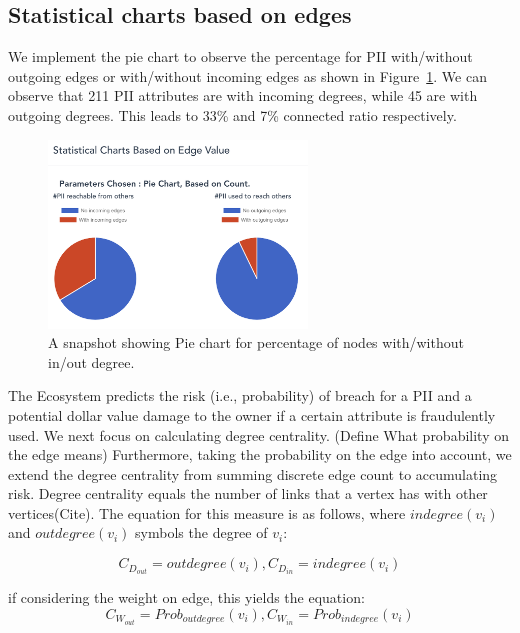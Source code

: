 \documentclass[conference]{IEEEtran}
\begin{document}
\subsection{Statistical charts based on edges}
We implement the pie chart to observe the percentage for PII with/without outgoing edges or with/without incoming edges as shown in Figure~\ref{fig:pie_pii}. We can observe that 211 PII attributes are with incoming degrees, while 45 are with outgoing degrees. This leads to 33\% and 7\% connected ratio respectively.
\begin{figure}[h!]
  \includegraphics[width=\linewidth, height=5cm]{pie_PII.png}
  \caption{A snapshot showing Pie chart for percentage of nodes with/without in/out degree.}
  \label{fig:pie_pii}
\end{figure}

 The Ecosystem predicts the risk (i.e., probability) of breach for a PII and a potential dollar value damage to the owner if a certain attribute is fraudulently used. We next focus on calculating degree centrality. 
 (Define What probability on the edge means)
 Furthermore, taking the probability on the edge into account, we extend the degree centrality from summing discrete edge count to accumulating risk.
Degree centrality equals the number of links that a vertex has with other vertices(Cite). The equation for this measure is as follows, where $indegree(v_{i})$ and $outdegree(v_{i})$ symbols the degree of $v_{i}$: 

\begin{equation}
C_{D_{out}} = outdegree(v_{i}), C_{D_{in}} = indegree(v_{i})
\label{degree_centrality_equation}
\end{equation}

if considering the weight on edge, this yields the equation:
\begin{equation}
C_{W_{out}} = Prob_{outdegree}(v_{i}), C_{W_{in}} = Prob_{indegree}(v_{i})
\label{degree_centrality_with_weight_equation}
\end{equation}
\end{document}
